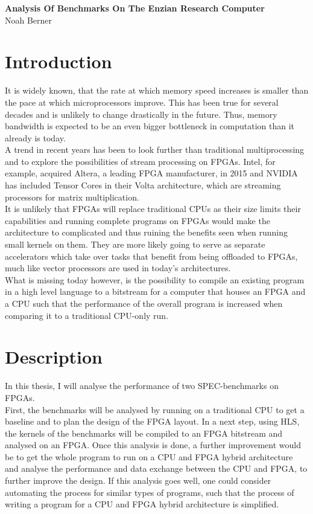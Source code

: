 \documentclass[12pt]{article}
\begin{document}
\begingroup  
  \centering
  \LARGE \textbf{Analysis Of Benchmarks On The Enzian Research Computer}\\
  \large Noah Berner\par
\endgroup

\section*{Introduction}
It is widely known, that the rate at which memory speed increases is smaller than the pace at which microprocessors improve. This has been true for several decades and is unlikely to change drastically in the future. Thus, memory bandwidth is expected to be an even bigger bottleneck in computation than it already is today.\\
A trend in recent years has been to look further than traditional multiprocessing and to explore the possibilities of stream processing on FPGAs. Intel, for example, acquired Altera, a leading FPGA manufacturer, in 2015 and NVIDIA has included Tensor Cores in their Volta architecture, which are streaming processors for matrix multiplication.\\
It is unlikely that FPGAs will replace traditional CPUs as their size limits their capabilities and running complete programs on FPGAs would make the architecture to complicated and thus ruining the benefits seen when running small kernels on them. They are more likely going to serve as separate accelerators which take over tasks that benefit from being offloaded to FPGAs, much like vector processors are used in today's architectures.\\
What is missing today however, is the possibility to compile an existing program in a high level language to a bitstream for a computer that houses an FPGA and a CPU such that the performance of the overall program is increased when comparing it to a traditional CPU-only run.
\section*{Description}
In this thesis, I will analyse the performance of two SPEC-benchmarks on FPGAs.\\
First, the benchmarks will be analysed by running on a traditional CPU to get a baseline and to plan the design of the FPGA layout. In a next step, using HLS, the kernels of the benchmarks will be compiled to an FPGA bitstream and analysed on an FPGA. Once this analysis is done, a further improvement would be to get the whole program to run on a CPU and FPGA hybrid architecture and analyse the performance and data exchange between the CPU and FPGA, to further improve the design. If this analysis goes well, one could consider automating the process for similar types of programs, such that the process of writing a program for a CPU and FPGA hybrid architecture is simplified.
\end{document}
